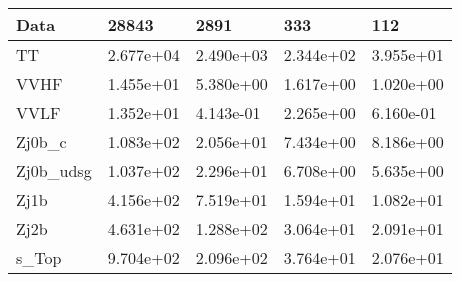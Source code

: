 \begin{table}
{\begin{tabularx}{\textwidth}{|X|X|X|X|X|}
\hline
Data & 28843 & 2891 & 333 & 112 \\
\hline
TT & 2.677e+04 & 2.490e+03 & 2.344e+02 & 3.955e+01 \\
VVHF & 1.455e+01 & 5.380e+00 & 1.617e+00 & 1.020e+00 \\
VVLF & 1.352e+01 & 4.143e-01 & 2.265e+00 & 6.160e-01 \\
Zj0b\_c & 1.083e+02 & 2.056e+01 & 7.434e+00 & 8.186e+00 \\
Zj0b\_udsg & 1.037e+02 & 2.296e+01 & 6.708e+00 & 5.635e+00 \\
Zj1b & 4.156e+02 & 7.519e+01 & 1.594e+01 & 1.082e+01 \\
Zj2b & 4.631e+02 & 1.288e+02 & 3.064e+01 & 2.091e+01 \\
s\_Top & 9.704e+02 & 2.096e+02 & 3.764e+01 & 2.076e+01 \\
\hline
\end{tabularx}
}
\label{tab:cr-Zmm-2018}
\end{table}

